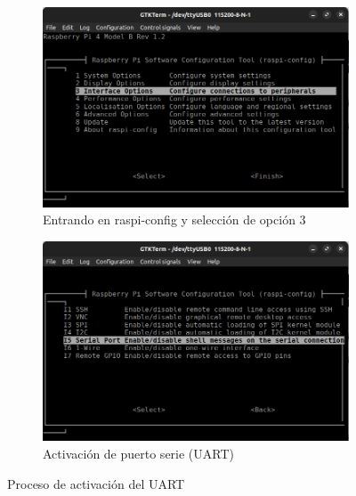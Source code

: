 \begin{figure}[H]
    \centering
    \begin{subfigure}[b]{0.49\textwidth}
        \includegraphics[width=\textwidth]{figs/raspiconfig-opcion3.png}
        \caption{Entrando en raspi-config y selección de opción 3}
        \label{fig:activarUART1}
    \end{subfigure}
    \hfill
    \begin{subfigure}[b]{0.49\textwidth}
        \includegraphics[width=\textwidth]{figs/raspiconfig-activarUART.png}
        \caption{Activación de puerto serie (\ac{UART})}
        \label{fig:activarUART2}
    \end{subfigure}
    \caption{Proceso de activación del \ac{UART}}
    \label{fig:activarUART}
\end{figure}

